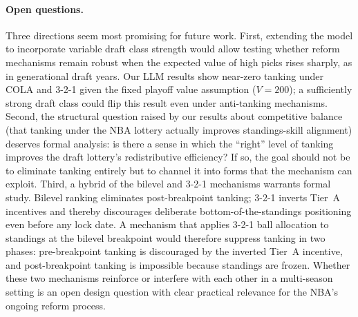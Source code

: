 \documentclass{article}
\begin{document}
\paragraph{Open questions.}
Three directions seem most promising for future work.
First, extending the model to incorporate variable draft class strength
would allow testing whether reform mechanisms remain robust when the expected
value of high picks rises sharply, as in generational draft years.
Our LLM results show near-zero tanking under COLA and 3-2-1 given the
fixed playoff value assumption ($V = 200$); a sufficiently strong draft class
could flip this result even under anti-tanking mechanisms.
Second, the structural question raised by our results about competitive
balance (that tanking under the NBA lottery actually improves standings-skill
alignment) deserves formal analysis: is there a sense in which the ``right''
level of tanking improves the draft lottery's redistributive efficiency?
If so, the goal should not be to eliminate tanking entirely but to channel it
into forms that the mechanism can exploit.
Third, a hybrid of the bilevel and 3-2-1 mechanisms warrants formal study.
Bilevel ranking eliminates post-breakpoint tanking; 3-2-1 inverts Tier~A
incentives and thereby discourages deliberate bottom-of-the-standings
positioning even before any lock date.
A mechanism that applies 3-2-1 ball allocation to standings at the bilevel
breakpoint would therefore suppress tanking in two phases: pre-breakpoint
tanking is discouraged by the inverted Tier~A incentive, and post-breakpoint
tanking is impossible because standings are frozen.
Whether these two mechanisms reinforce or interfere with each other in a
multi-season setting is an open design question with clear practical relevance
for the NBA's ongoing reform process.

\end{document}
